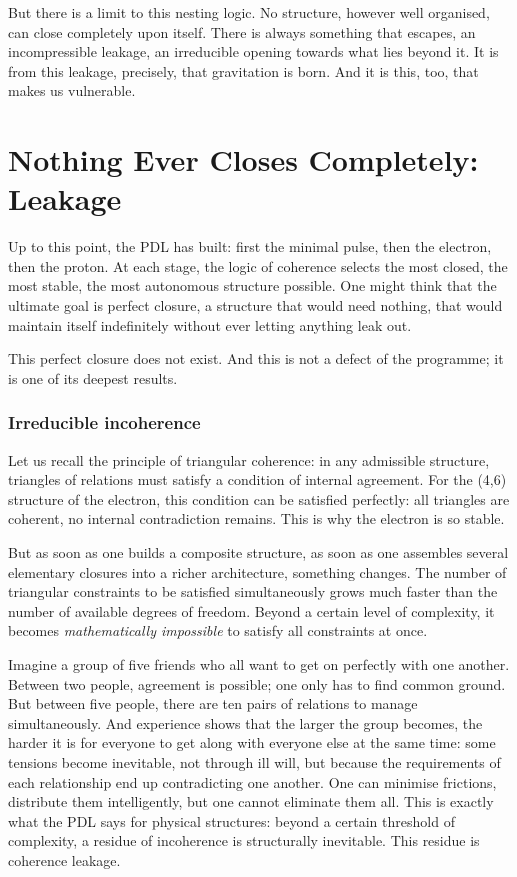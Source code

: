 \documentclass[11pt, a4paper, openright]{book}
\begin{document}
\medskip

But there is a limit to this nesting logic. No structure, however well organised, can close completely upon itself. There is always something that escapes, an incompressible leakage, an irreducible opening towards what lies beyond it. It is from this leakage, precisely, that gravitation is born. And it is this, too, that makes us vulnerable.

\chapter{Nothing Ever Closes Completely: Leakage}

Up to this point, the PDL has built: first the minimal pulse, then the electron, then the proton. At each stage, the logic of coherence selects the most closed, the most stable, the most autonomous structure possible. One might think that the ultimate goal is perfect closure, a structure that would need nothing, that would maintain itself indefinitely without ever letting anything leak out.

\medskip

This perfect closure does not exist. And this is not a defect of the programme; it is one of its deepest results.

\subsection*{Irreducible incoherence}

Let us recall the principle of triangular coherence: in any admissible structure, triangles of relations must satisfy a condition of internal agreement. For the (4,6) structure of the electron, this condition can be satisfied perfectly: all triangles are coherent, no internal contradiction remains. This is why the electron is so stable.

\medskip

But as soon as one builds a composite structure, as soon as one assembles several elementary closures into a richer architecture, something changes. The number of triangular constraints to be satisfied simultaneously grows much faster than the number of available degrees of freedom. Beyond a certain level of complexity, it becomes \emph{mathematically impossible} to satisfy all constraints at once.

\medskip

Imagine a group of five friends who all want to get on perfectly with one another. Between two people, agreement is possible; one only has to find common ground. But between five people, there are ten pairs of relations to manage simultaneously. And experience shows that the larger the group becomes, the harder it is for everyone to get along with everyone else at the same time: some tensions become inevitable, not through ill will, but because the requirements of each relationship end up contradicting one another. One can minimise frictions, distribute them intelligently, but one cannot eliminate them all. This is exactly what the PDL says for physical structures: beyond a certain threshold of complexity, a residue of incoherence is structurally inevitable. This residue is coherence leakage.
\end{document}
